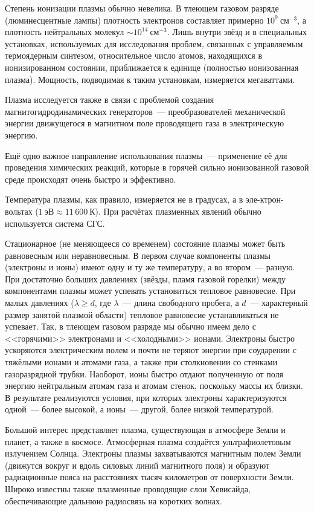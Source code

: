 Степень ионизации плазмы обычно невелика. В тлеющем газовом разряде (люминесцентные лампы) плотность электронов
составляет примерно $10^9~\text{см}^{-3}$, а плотность нейтральных молекул ${\sim}10^{14}~\text{см}^{-3}$. Лишь внутри звёзд и в
специальных установках, используемых для исследования проблем, связанных с управляемым термоядерным синтезом,
относительное число атомов, находящихся в ионизированном состоянии, приближается к единице (полностью ионизованная
плазма). Мощность, подводимая к таким установкам, измеряется мегаваттами.

Плазма исследуется также в связи с проблемой создания магнитогидродинамических генераторов~--- преобразователей
механической энергии движущегося в магнитном поле проводящего газа в электрическую энергию.

Ещё одно важное направление использования плазмы~--- применение её для проведения химических реакций, которые в горячей
сильно ионизованной газовой среде происходят очень быстро и эффективно.

Температура плазмы, как правило, измеряется не в градусах, а в эле-ктрон-вольтах ($1~\text{эВ}\approx 11\,600~\text{К}$). При расчётах
плазменных явлений обычно используется система СГС.

Стационарное (не меняющееся со временем) состояние плазмы может быть равновесным или неравновесным. В первом случае
компоненты плазмы (электроны и ионы) имеют одну и ту же температуру, а во втором~--- разную. При достаточно больших
давлениях (звёзды, пламя газовой горелки) между компонентами плазмы может успевать установиться тепловое равновесие. При
малых давлениях ($\lambda\ge d$, где $\lambda$~--- длина свободного пробега, а $d$~--- характерный размер занятой
плазмой области) тепловое равновесие устанавливаться не успевает. Так, в тлеющем газовом разряде мы обычно имеем дело с
<<горячими>> электронами и <<холодными>> ионами. Электроны быстро ускоряются электрическим полем и почти не теряют
энергии при соударении с тяжёлыми ионами и атомами газа, а также при столкновении со стенками газоразрядной трубки.
Наоборот, ионы быстро отдают полученную от поля энергию нейтральным атомам газа и атомам стенок, поскольку массы их
близки. В результате реализуются условия, при которых электроны характеризуются одной~--- более высокой, а ионы~---
другой, более низкой температурой.

Большой интерес представляет плазма, существующая в атмосфере Земли и планет, а также в космосе. Атмосферная плазма
создаётся ультрафиолетовым излучением Солнца. Электроны плазмы захватываются магнитным полем Земли (движутся вокруг и
вдоль силовых линий магнитного поля) и образуют радиационные пояса на расстояниях тысяч километров от поверхности Земли.
Широко известны также плазменные проводящие слои Хевисайда, обеспечивающие дальнюю радиосвязь на коротких волнах.


